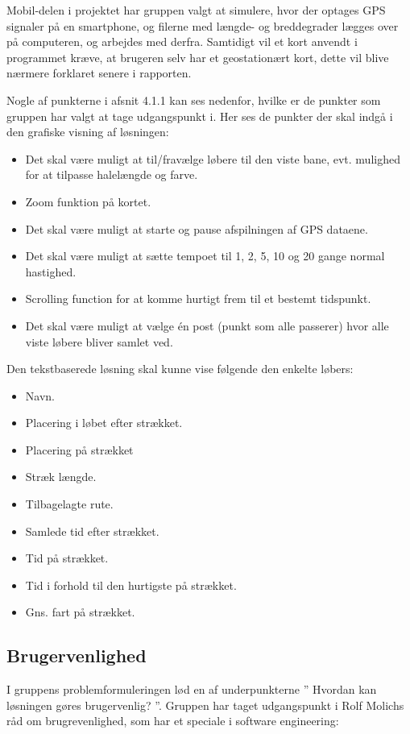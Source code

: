Mobil-delen i projektet har gruppen valgt at simulere, hvor der optages GPS signaler på en smartphone, og filerne med længde- og breddegrader lægges over på computeren, og arbejdes med derfra. Samtidigt vil et kort anvendt i programmet kræve, at brugeren selv har et geostationært kort, dette vil blive nærmere forklaret senere i rapporten.

Nogle af punkterne i afsnit 4.1.1 kan ses nedenfor, hvilke er de punkter som gruppen har valgt at tage udgangspunkt i. Her ses de punkter der skal indgå i den grafiske visning af løsningen:
\begin{itemize}
	\item Det skal være muligt at til/fravælge løbere til den viste bane, evt. mulighed for at tilpasse halelængde og farve.
	\item Zoom funktion på kortet.
	\item Det skal være muligt at starte og pause afspilningen af GPS dataene.
	\item Det skal være muligt at sætte tempoet til 1, 2, 5, 10 og 20 gange normal hastighed.
	\item Scrolling function for at komme hurtigt frem til et bestemt tidspunkt.
	\item Det skal være muligt at vælge én post (punkt som alle passerer) hvor alle viste løbere bliver samlet ved.
\end{itemize}
Den tekstbaserede løsning skal kunne vise følgende den enkelte løbers:
\begin{itemize}
	\item Navn.
	\item Placering i løbet efter strækket.
	\item Placering på strækket
	\item Stræk længde.
	\item Tilbagelagte rute.
	\item Samlede tid efter strækket.
	\item Tid på strækket.
	\item Tid i forhold til den hurtigste på strækket.
	\item Gns. fart på strækket.
\end{itemize}


\subsection{Brugervenlighed}
I gruppens problemformuleringen lød en af underpunkterne ” Hvordan kan løsningen gøres brugervenlig? ”. Gruppen har taget udgangspunkt i Rolf Molichs råd om brugrevenlighed, som har et speciale i software engineering: %

